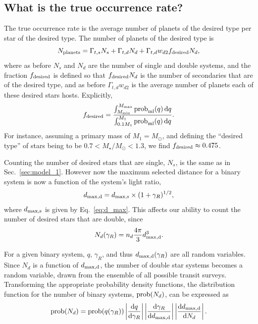 \documentclass{emulateapj}
\begin{document}
\subsection{What is the true occurrence rate?}

The true occurrence rate is the average number of planets of the desired type 
per star of the desired type.
The number of planets of the desired type is
\begin{equation}
N_{\rm planets} = \Gamma_{t,s}N_s + \Gamma_{t,d}N_d + 
\Gamma_{t,d}w_{d2}f_{{\rm desired}}N_d,
\end{equation}
where as before $N_s$ and $N_d$ are the number of single and double systems, 
and the fraction $f_{{\rm desired}}$ is defined so that $f_{{\rm desired}} 
N_d$ is the number of secondaries that are of the desired type, and as before 
$\Gamma_{t,d}w_{d2}$ is the average number of planets each of these desired 
stars hosts.
Explicitly,
\begin{equation}
f_{\rm desired} = \frac{\int_{M_{\rm min}}^{M_{\rm max}} {\rm prob}_{\rm 
        ml}(q)\,{\rm d}q }
{\int_{0.1M_1}^{M_1} {\rm prob}_{\rm 
        ml}(q)\,{\rm d}q}.
\end{equation}
For instance, assuming a primary mass of $M_1 = M_\odot$, and defining the 
``desired type'' of stars being to be $0.7<M_\star/M_\odot<1.3$, we find 
$f_{\rm desired}\approx0.475$.

Counting the number of desired stars that are single, $N_s$, is the same as in 
Sec.~\ref{sec:model_1}. However now the maximum selected distance for a binary 
system is now a function of the system's light ratio,
\begin{equation}
d_{\rm max,d} =
d_{\rm max,s}\times (1+\gamma_R)^{1/2},
\end{equation}
where $d_{\rm max,s}$ is given by Eq.~\ref{eq:d_max}.
This affects our ability to count the number of desired stars that are double,
since
\begin{equation}
N_d(\gamma_R) = n_d \frac{4\pi}{3} d_{\rm max,d}^3.
\end{equation}

For a given binary system, $q$, $\gamma_R$, and thus $d_{\rm 
	max,d}(\gamma_R)$ are all random variables.
Since $N_d$ is a function of $d_{\rm max,d}$, 
the number of double star systems becomes a random variable, drawn from the 
ensemble of all possible transit surveys.
Transforming the appropriate probability density functions, the distribution 
function for the number of binary systems,
${\rm prob}(N_d)$, can be expressed as 
\begin{equation}
{\rm prob}(N_d) = {\rm prob}(q(\gamma_R)) 
\left| \frac{{\rm d}q}{{\rm d}\gamma_R}  \right|
\left| \frac{{\rm d}\gamma_R}{{\rm d}d_{\rm max,d}}  \right|				
\left| \frac{{\rm d}d_{\rm max,d}}{{\rm d}N_d}  \right|.
\label{eq:prob_Nd_raw}
\end{equation}
\end{document}
